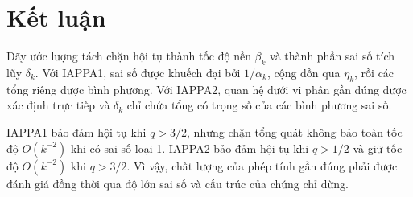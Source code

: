 \section{Kết luận}

Dãy ước lượng tách chặn hội tụ thành tốc độ nền $\beta_k$ và thành phần sai số tích lũy $\delta_k$. Với IAPPA1, sai số được khuếch đại bởi $1/\alpha_k$, cộng dồn qua $\eta_k$, rồi các tổng riêng được bình phương. Với IAPPA2, quan hệ dưới vi phân gần đúng được xác định trực tiếp và $\delta_k$ chỉ chứa tổng có trọng số của các bình phương sai số.

IAPPA1 bảo đảm hội tụ khi $q>3/2$, nhưng chặn tổng quát không bảo toàn tốc độ $O(k^{-2})$ khi có sai số loại 1. IAPPA2 bảo đảm hội tụ khi $q>1/2$ và giữ tốc độ $O(k^{-2})$ khi $q>3/2$. Vì vậy, chất lượng của phép tính gần đúng phải được đánh giá đồng thời qua độ lớn sai số và cấu trúc của chứng chỉ dừng.


